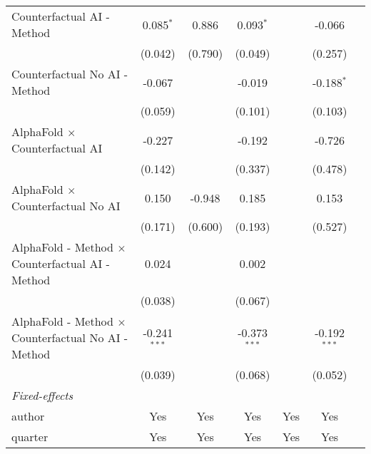 \begin{tabular}{lcccccc}
   Counterfactual AI - Method                                 & 0.085$^{*}$    & 0.886   & 0.093$^{*}$    &         & -0.066         &   \\   
                                                              & (0.042)        & (0.790) & (0.049)        &         & (0.257)        &   \\   
   Counterfactual No AI - Method                              & -0.067         &         & -0.019         &         & -0.188$^{*}$   &   \\   
                                                              & (0.059)        &         & (0.101)        &         & (0.103)        &   \\   
   AlphaFold $\times$ Counterfactual AI                       & -0.227         &         & -0.192         &         & -0.726         &   \\   
                                                              & (0.142)        &         & (0.337)        &         & (0.478)        &   \\   
   AlphaFold $\times$ Counterfactual No AI                    & 0.150          & -0.948  & 0.185          &         & 0.153          &   \\   
                                                              & (0.171)        & (0.600) & (0.193)        &         & (0.527)        &   \\   
   AlphaFold - Method $\times$ Counterfactual AI - Method     & 0.024          &         & 0.002          &         &                &   \\   
                                                              & (0.038)        &         & (0.067)        &         &                &   \\   
   AlphaFold - Method $\times$ Counterfactual No AI - Method  & -0.241$^{***}$ &         & -0.373$^{***}$ &         & -0.192$^{***}$ &   \\   
                                                              & (0.039)        &         & (0.068)        &         & (0.052)        &   \\   
   \midrule
   \emph{Fixed-effects}\\
   author                                                     & Yes            & Yes     & Yes            & Yes     & Yes            & \\  
   quarter                                                    & Yes            & Yes     & Yes            & Yes     & Yes            & \\  

\end{tabular}
